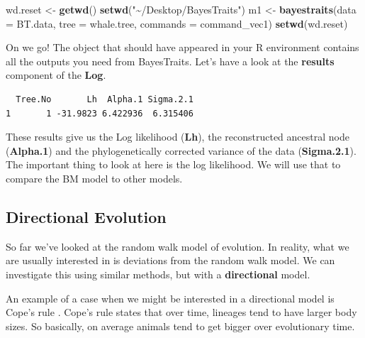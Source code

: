 \documentclass[
]{book}
\newenvironment{Shaded}{\begin{snugshade}}{\end{snugshade}}
\newcommand{\DataTypeTok}[1]{\textcolor[rgb]{0.13,0.29,0.53}{#1}}
\newcommand{\KeywordTok}[1]{\textcolor[rgb]{0.13,0.29,0.53}{\textbf{#1}}}
\newcommand{\NormalTok}[1]{#1}
\newcommand{\OperatorTok}[1]{\textcolor[rgb]{0.81,0.36,0.00}{\textbf{#1}}}
\newcommand{\StringTok}[1]{\textcolor[rgb]{0.31,0.60,0.02}{#1}}
\begin{document}
\begin{Shaded}
\begin{Highlighting}[]
\NormalTok{wd.reset \textless{}{-}}\StringTok{ }\KeywordTok{getwd}\NormalTok{()}
\KeywordTok{setwd}\NormalTok{(}\StringTok{"\textasciitilde{}/Desktop/BayesTraits"}\NormalTok{)}
\NormalTok{m1 \textless{}{-}}\StringTok{ }\KeywordTok{bayestraits}\NormalTok{(}\DataTypeTok{data =}\NormalTok{ BT.data, }\DataTypeTok{tree =}\NormalTok{ whale.tree, }\DataTypeTok{commands =}\NormalTok{ command\_vec1)}
\KeywordTok{setwd}\NormalTok{(wd.reset)}
\end{Highlighting}
\end{Shaded}

On we go! The object that should have appeared in your R environment contains all the outputs you need from BayesTraits. Let's have a look at the \textbf{results} component of the \textbf{Log}.

\begin{Shaded}
\end{Shaded}

\begin{verbatim}
  Tree.No       Lh  Alpha.1 Sigma.2.1
1       1 -31.9823 6.422936  6.315406
\end{verbatim}

These results give us the Log likelihood (\textbf{Lh}), the reconstructed ancestral node (\textbf{Alpha.1}) and the phylogenetically corrected variance of the data (\textbf{Sigma.2.1}). The important thing to look at here is the log likelihood. We will use that to compare the BM model to other models.

\hypertarget{directional-evolution}{%
\subsection{Directional Evolution}\label{directional-evolution}}

So far we've looked at the random walk model of evolution. In reality, what we are usually interested in is deviations from the random walk model. We can investigate this using similar methods, but with a \textbf{directional} model.

An example of a case when we might be interested in a directional model is Cope's rule \citep{Kingsolver04, Hone05}. Cope's rule states that over time, lineages tend to have larger body sizes. So basically, on average animals tend to get bigger over evolutionary time.
\end{document}
